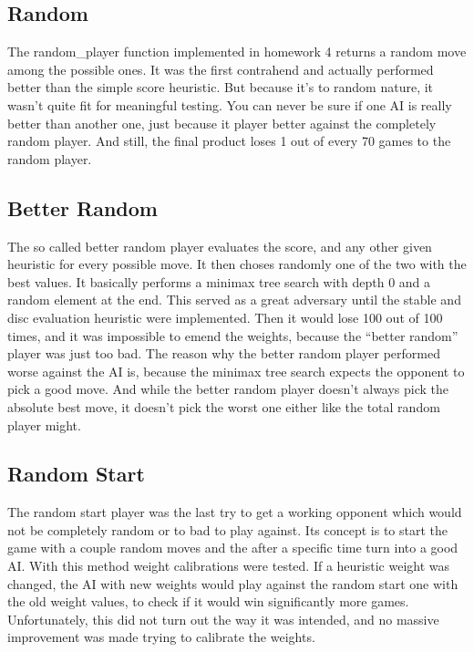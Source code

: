 \subsection{Random}
The random\_player function implemented in homework 4 returns a random move among the possible ones. It was the first contrahend and actually performed better than the simple score heuristic. But because it’s to random nature, it wasn’t quite fit for meaningful testing. You can never be sure if one AI is really better than another one, just because it player better against the completely random player. And still, the final product loses 1 out of every 70 games to the random player.
\subsection{Better Random}
The so called better random player evaluates the score, and any other given heuristic for every possible move. It then choses randomly one of the two with the best values. It basically performs a minimax tree search with depth 0 and a random element at the end. This served as a great adversary until the stable and disc evaluation heuristic were implemented. Then it would lose 100 out of 100 times, and it was impossible to emend the weights, because the “better random” player was just too bad. The reason why the better random player performed worse against the AI is, because the minimax tree search expects the opponent to pick a good move. And while the better random player doesn’t always pick the absolute best move, it doesn’t pick the worst one either like the total random player might.
\subsection{Random Start}
The random start player was the last try to get a working opponent which would not be completely random or to bad to play against. Its concept is to start the game with a couple random moves and the after a specific time turn into a good AI. With this method weight calibrations were tested. If a heuristic weight was changed, the AI with new weights would play against the random start one with the old weight values, to check if it would win significantly more games. Unfortunately, this did not turn out the way it was intended, and no massive improvement was made trying to calibrate the weights.


